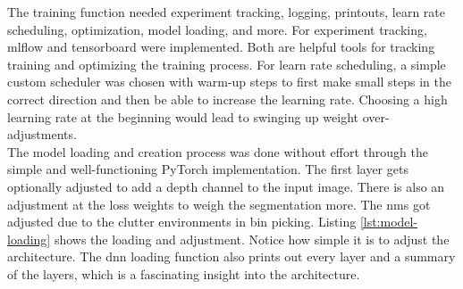 		The training function needed experiment tracking, logging, printouts, learn rate scheduling, optimization, model loading, and more. For experiment tracking, mlflow and tensorboard were implemented. Both are helpful tools for tracking training and optimizing the training process. For learn rate scheduling, a simple custom scheduler was chosen with warm-up steps to first make small steps in the correct direction and then be able to increase the learning rate. Choosing a high learning rate at the beginning would lead to swinging up weight over-adjustments. \\
		The model loading and creation process was done without effort through the simple and well-functioning PyTorch implementation. The first layer gets optionally adjusted to add a depth channel to the input image. There is also an adjustment at the loss weights to weigh the segmentation more. The \acl{nms} got adjusted due to the clutter environments in bin picking. Listing \ref{lst:model-loading} shows the loading and adjustment. Notice how simple it is to adjust the architecture. The \ac{dnn} loading function also prints out every layer and a summary of the layers, which is a fascinating insight into the architecture.
		\clearpage
		
